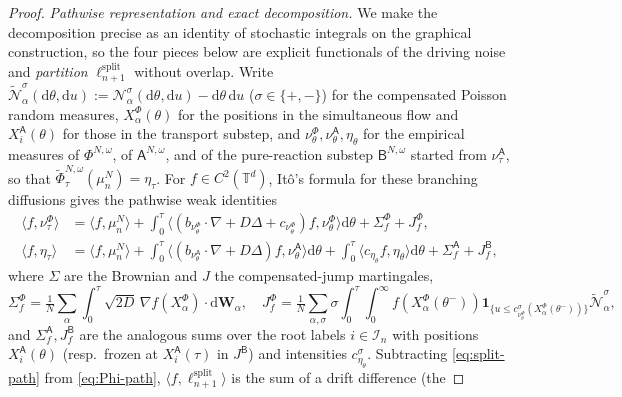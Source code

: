 \documentclass[a4paper,fleqn]{cas-sc}
\theoremstyle{definition}
\theoremstyle{remark}
\begin{document}
\begin{proof}
\emph{Pathwise representation and exact decomposition.} We make the decomposition
precise as an identity of stochastic integrals on the graphical construction, so the
four pieces below are explicit functionals of the driving noise and \emph{partition}
$\ell^{\mathrm{split}}_{n+1}$ without overlap. Write
$\widetilde{\mathcal N}^{\sigma}_\alpha(\mathrm d\theta,\mathrm du):=\mathcal N^{\sigma}_\alpha(\mathrm d\theta,\mathrm du)-\mathrm d\theta\,\mathrm du$
($\sigma\in\{+,-\}$) for the compensated Poisson random measures, $X^\Phi_\alpha(\theta)$
for the positions in the simultaneous flow and $X^{\mathsf A}_i(\theta)$ for those in
the transport substep, and $\nu^\Phi_\theta,\nu^{\mathsf A}_\theta,\eta_\theta$ for the
empirical measures of $\Phi^{N,\omega}$, of $\mathsf A^{N,\omega}$, and of the
pure-reaction substep $\mathsf B^{N,\omega}$ started from $\nu^{\mathsf A}_\tau$, so
that $\widetilde\Phi^{N,\omega}_\tau(\mu^N_n)=\eta_\tau$. For $f\in C^2(\mathbb T^d)$,
It\^o's formula for these branching diffusions gives the pathwise weak identities
\begin{align}
\langle f,\nu^\Phi_\tau\rangle
&=\langle f,\mu^N_n\rangle
+\int_0^\tau\!\bigl\langle (b_{\nu^\Phi_\theta}\!\cdot\!\nabla+D\Delta+c_{\nu^\Phi_\theta})f,\nu^\Phi_\theta\bigr\rangle\mathrm d\theta
+\Sigma^\Phi_f+J^\Phi_f,\label{eq:Phi-path}\\
\langle f,\eta_\tau\rangle
&=\langle f,\mu^N_n\rangle
+\int_0^\tau\!\bigl\langle (b_{\nu^{\mathsf A}_\theta}\!\cdot\!\nabla+D\Delta)f,\nu^{\mathsf A}_\theta\bigr\rangle\mathrm d\theta
+\int_0^\tau\!\bigl\langle c_{\eta_\theta}f,\eta_\theta\bigr\rangle\mathrm d\theta
+\Sigma^{\mathsf A}_f+J^{\mathsf B}_f,\label{eq:split-path}
\end{align}
where $\Sigma$ are the Brownian and $J$ the compensated-jump martingales,
\[
\Sigma^\Phi_f=\tfrac1N\!\sum_{\alpha}\!\int_0^\tau\!\!\sqrt{2D}\,\nabla f(X^\Phi_\alpha)\!\cdot\!\mathrm d\mathbf W_\alpha,
\quad
J^\Phi_f=\tfrac1N\!\sum_{\alpha,\sigma}\!\sigma\!\int_0^\tau\!\!\!\int_0^\infty\!\! f(X^\Phi_\alpha(\theta^-))\mathbf 1_{\{u\le c^{\sigma}_{\nu^\Phi_\theta}(X^\Phi_\alpha(\theta^-))\}}\widetilde{\mathcal N}^{\sigma}_\alpha,
\]
and $\Sigma^{\mathsf A}_f,J^{\mathsf B}_f$ are the analogous sums over the root labels
$i\in\mathcal I_n$ with positions $X^{\mathsf A}_i(\theta)$ (resp.\ frozen at
$X^{\mathsf A}_i(\tau)$ in $J^{\mathsf B}$) and intensities $c^{\sigma}_{\eta_\theta}$.
Subtracting \eqref{eq:split-path} from \eqref{eq:Phi-path},
$\langle f,\ell^{\mathrm{split}}_{n+1}\rangle$ is the sum of a drift difference (the

\end{proof}
\end{document}
